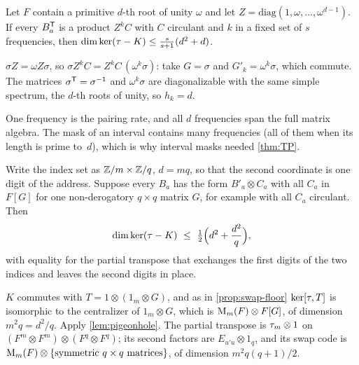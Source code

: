 \begin{corollary}\label{cor:weyl}
\notformalized
Let $F$ contain a primitive $d$-th root of unity $\omega$ and let $Z=\mathrm{diag}(1,\omega,\dots,\omega^{d-1})$. If
every $B_a^{\mathsf{T}}$ is a product $Z^kC$ with $C$ circulant and $k$ in a fixed set of $s$ frequencies, then
$\dim\ker(\tau-K)\le\frac s{s+1}(d^2+d)$.
\end{corollary}

\begin{informalproof}
$\sigma Z=\omega Z\sigma$, so $\sigma Z^kC=Z^kC\,(\omega^k\sigma)$: take $G=\sigma$ and $G'_k=\omega^k\sigma$, which
commute. The matrices $\sigma^{\mathsf{T}}=\sigma^{-1}$ and $\omega^k\sigma$ are diagonalizable with the same simple spectrum,
the $d$-th roots of unity, so $h_k=d$.
\end{informalproof}

One frequency is the pairing rate, and all $d$ frequencies span the full matrix algebra. The mask of an interval
contains many frequencies (all of them when its length is prime to~$d$), which is why interval masks needed
\cref{thm:TP}.

\begin{corollary}\label{cor:digit}
Write the index set as $\mathbb{Z}/m\times\mathbb{Z}/q$, $d=mq$, so that the second coordinate is one digit of the address. Suppose
every $B_a$ has the form $B'_a\otimes C_a$ with all $C_a$ in $F[G]$ for one non-derogatory $q\times q$ matrix $G$, for
example with all $C_a$ circulant. Then
\[
  \dim\ker(\sw-K)\ \le\ \tfrac12\Bigl(d^2+\frac{d^2}q\Bigr),
\]
with equality for the partial transpose that exchanges the first digits of the two indices and leaves the second
digits in place.
\end{corollary}

\begin{informalproof}
$K$ commutes with $T=1\otimes(1_m\otimes G)$, and as in \cref{prop:swap-floor} $\ker[\tau,T]$ is isomorphic to the
centralizer of $1_m\otimes G$, which is $\mathrm{M}_m(F)\otimes F[G]$, of dimension $m^2q=d^2/q$. Apply
\cref{lem:pigeonhole}. The partial transpose is $\tau_m\otimes1$ on $(F^m\otimes F^m)\otimes(F^q\otimes F^q)$; its second
factors are $E_{u'u}\otimes1_q$, and its swap code is $\mathrm{M}_m(F)\otimes\{\text{symmetric }q\times q\text{ matrices}\}$,
of dimension $m^2q(q+1)/2$.
\end{informalproof}

